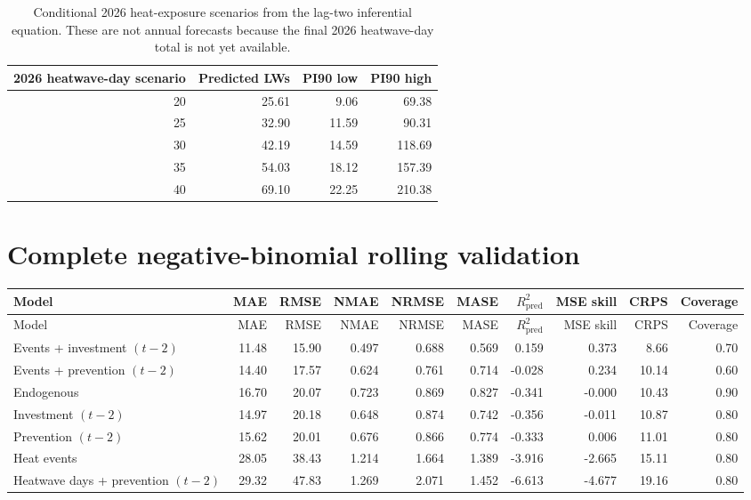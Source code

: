 \documentclass[10pt,a4paper]{article}
\begin{document}
\begin{table}[H]\centering\small
\begin{tabular}{rrrr}
\toprule
2026 heatwave-day scenario & Predicted LWs & PI90 low & PI90 high \\
\midrule
20 & 25.61 & 9.06 & 69.38 \\
25 & 32.90 & 11.59 & 90.31 \\
30 & 42.19 & 14.59 & 118.69 \\
35 & 54.03 & 18.12 & 157.39 \\
40 & 69.10 & 22.25 & 210.38 \\
\bottomrule
\end{tabular}
\caption{Conditional 2026 heat-exposure scenarios from the lag-two inferential equation. These are not annual forecasts because the final 2026 heatwave-day total is not yet available.}
\end{table}

\section{Complete negative-binomial rolling validation}
{\scriptsize\setlength{\tabcolsep}{3pt}
\begin{longtable}{lrrrrrrrrr}
\toprule
Model & MAE & RMSE & NMAE & NRMSE & MASE & $R^2_{\mathrm{pred}}$ & MSE skill & CRPS & Coverage \\
\midrule
\endfirsthead
\toprule
Model & MAE & RMSE & NMAE & NRMSE & MASE & $R^2_{\mathrm{pred}}$ & MSE skill & CRPS & Coverage \\
\midrule
\endhead

Events + investment $(t-2)$ & 11.48 & 15.90 & 0.497 & 0.688 & 0.569 & 0.159 & 0.373 & 8.66 & 0.70 \\
Events + prevention $(t-2)$ & 14.40 & 17.57 & 0.624 & 0.761 & 0.714 & -0.028 & 0.234 & 10.14 & 0.60 \\
Endogenous & 16.70 & 20.07 & 0.723 & 0.869 & 0.827 & -0.341 & -0.000 & 10.43 & 0.90 \\
Investment $(t-2)$ & 14.97 & 20.18 & 0.648 & 0.874 & 0.742 & -0.356 & -0.011 & 10.87 & 0.80 \\
Prevention $(t-2)$ & 15.62 & 20.01 & 0.676 & 0.866 & 0.774 & -0.333 & 0.006 & 11.01 & 0.80 \\
Heat events & 28.05 & 38.43 & 1.214 & 1.664 & 1.389 & -3.916 & -2.665 & 15.11 & 0.80 \\
Heatwave days + prevention $(t-2)$ & 29.32 & 47.83 & 1.269 & 2.071 & 1.452 & -6.613 & -4.677 & 19.16 & 0.80 \\
\bottomrule
\end{longtable}
}
\end{document}

